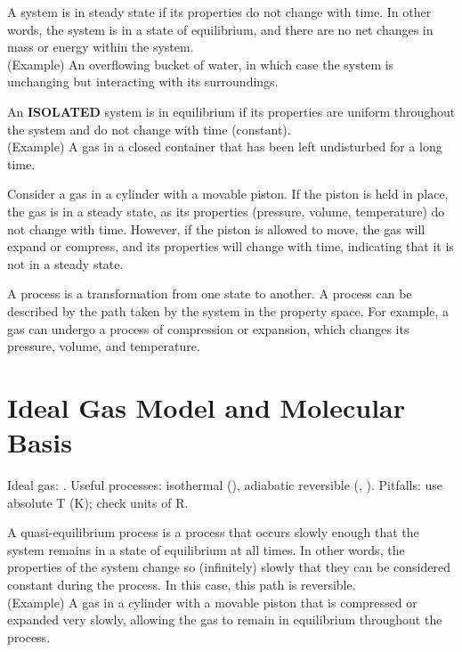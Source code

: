 \documentclass[11pt]{report}
\begin{document}
\begin{definition}
    A system is in steady state if its properties do not change with time. In other words, the system is in a state of equilibrium, and there are no net changes in mass or energy within the system. \\
    (Example) An overflowing bucket of water, in which case the system is unchanging but interacting with its surroundings.
\end{definition}

\begin{definition}[Equilibrium]
    An \textbf{ISOLATED} system is in equilibrium if its properties are uniform throughout the system and do not change with time (constant). \\
    (Example) A gas in a closed container that has been left undisturbed for a long time.
\end{definition}
\begin{example}
    Consider a gas in a cylinder with a movable piston. If the piston is held in place, the gas is in a steady state, as its properties (pressure, volume, temperature) do not change with time. However, if the piston is allowed to move, the gas will expand or compress, and its properties will change with time, indicating that it is not in a steady state. 
\end{example}
\begin{definition}[Process]
    A process is a transformation from one state to another. A process can be described by the path taken by the system in the property space. For example, a gas can undergo a process of compression or expansion, which changes its pressure, volume, and temperature.
\end{definition}

\section{Ideal Gas Model and Molecular Basis}
\begin{review}
Ideal gas: . Useful processes: isothermal (), adiabatic reversible (, ). Pitfalls: use absolute T (K); check units of R.
\end{review}
\begin{definition}
    A quasi-equilibrium process is a process that occurs slowly enough that the system remains in a state of equilibrium at all times. In other words, the properties of the system change so (infinitely) slowly that they can be considered constant during the process. In this case, this path is reversible. \\
    (Example) A gas in a cylinder with a movable piston that is compressed or expanded very slowly, allowing the gas to remain in equilibrium throughout the process.
\end{definition}
\end{document}

